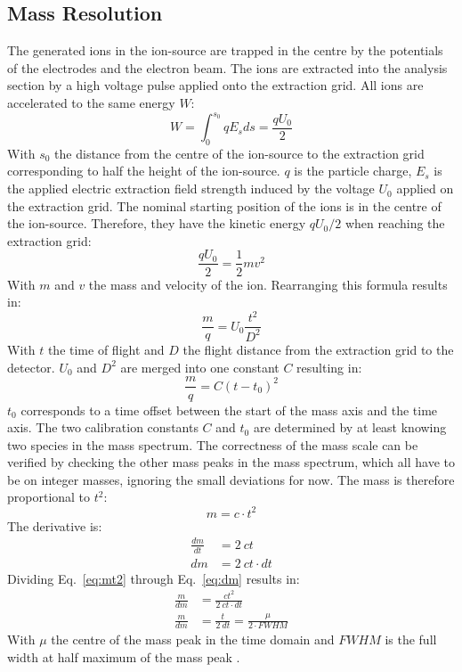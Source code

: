 	\subsection{Mass Resolution}\label{chap:massRes}
	The generated ions in the ion-source are trapped in the centre by the potentials of the electrodes and the electron beam. The ions are extracted into the analysis section by a high voltage pulse applied onto the extraction grid. All ions are accelerated to the same energy $W$:
	\begin{equation}
		W = \int_{0}^{s_0}q E_s ds =  \frac{q U_0}{2}
		\label{eq:WIonPulse}
	\end{equation}
	With $s_0$ the distance from the centre of the ion-source to the extraction grid corresponding to half the height of the ion-source. $q$ is the particle charge, $E_s$ is the applied electric extraction field strength induced by the voltage $U_0$ applied on the extraction grid. The nominal starting position of the ions is in the centre of the ion-source. Therefore, they have the kinetic energy $q U_0/2$ when reaching the extraction grid:
	\begin{equation}
		\frac{q U_0}{2} = \frac{1}{2}m v^2
	\end{equation}
	With $m$ and $v$ the mass and velocity of the ion. Rearranging this formula results in:
	\begin{equation}
		\frac{m}{q} = U_0\frac{t^2}{D^2}
		\label{eq:m/q}
	\end{equation}
	With $t$ the time of flight and $D$ the flight distance from the extraction grid to the detector. $U_0$ and $D^2$ are merged into one constant $C$ resulting in:
	\begin{equation}
		\frac{m}{q} = C(t-t_0)^2
		\label{eq:mass_Calib}
	\end{equation}
	$t_0$ corresponds to a time offset between the start of the mass axis and the time axis. The two calibration constants $C$ and $t_0$ are determined by at least knowing two species in the mass spectrum. The correctness of the mass scale can be verified by checking the other mass peaks in the mass spectrum, which all have to be on integer masses, ignoring the small deviations for now. The mass is therefore proportional to $t^2$:
	\begin{equation}
		m = c\cdot t^2
		\label{eq:mt2}
	\end{equation}
	The derivative is:
	\begin{align}
		\frac{dm}{dt} &= 2~ct\\
		dm &= 2~ct\cdot dt
		\label{eq:dm}
	\end{align}
	Dividing Eq.~\eqref{eq:mt2} through Eq.~\eqref{eq:dm} results in:
	\begin{align}
		\frac{m}{dm} &= \frac{ct^2}{2~ct\cdot dt}\\
		\frac{m}{dm} &= \frac{t}{2~dt} = \frac{\mu}{2\cdot FWHM}
		\label{eq:massRes}
	\end{align}
	With $\mu$ the centre of the mass peak in the time domain and $FWHM$ is the full width at half maximum of the mass peak \cite{LecNot_Wurz2017}.
	\\
	
